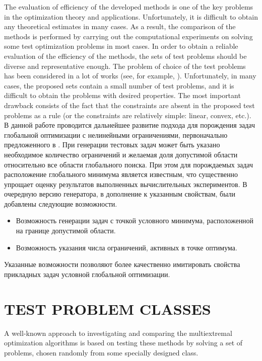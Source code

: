 \documentclass{aip-cp}
\begin{document}
The evaluation of efficiency of the developed methods is one of the key problems in the optimization theory and applications. Unfortunately, it is difficult to obtain any theoretical estimates in many cases. As a result, the comparison of the methods is performed by carrying out the computational experiments on solving some test optimization problems in most cases. In order to obtain a reliable evaluation of the efficiency of the methods, the sets of test problems should be diverse and representative enough. The problem of choice of the test problems has been considered in a lot of works (see, for example, \cite{Floudas1999,Gaviano2003,Ali2005,Addis2007}). Unfortunately, in many cases, the proposed sets contain a small number of test problems, and it is difficult to obtain the problems with desired properties. The most important drawback consists of the fact that the constraints are absent in the proposed test problems as a rule (or the constraints are relatively simple: linear, convex, etc.).
\Russian
В данной работе проводится дальнейшее развитие подхода для порождения задач глобальной оптимизации с нелинейными ограничениями, первоначально предложенного в \cite{Gergel2017}. При генерации тестовых задач может быть указано необходимое количество ограничений и желаемая доля допустимой области относительно все области глобального поиска. При этом для порождаемых задач расположение глобального минимума является известным, что существенно упрощает оценку результатов выполненных вычислительных экспериментов. В очередную версию генератора, в дополнение к указанным свойствам, были добавлены следующие возможности.
\begin{itemize}
	\item Возможность генерации задач с точкой условного минимума, расположенной на границе допустимой области.
	\item Возможность указания числа ограничений, активных в точке оптимума.
\end{itemize}

Указанные возможности позволяют более качественно имитировать свойства прикладных задач условной глобальной оптимизации.


\section{TEST PROBLEM CLASSES}
A well-known approach to investigating and comparing the multiextremal optimization algorithms is based on testing these methods by solving a set of problems, chosen randomly from some specially designed class. 
\end{document}
